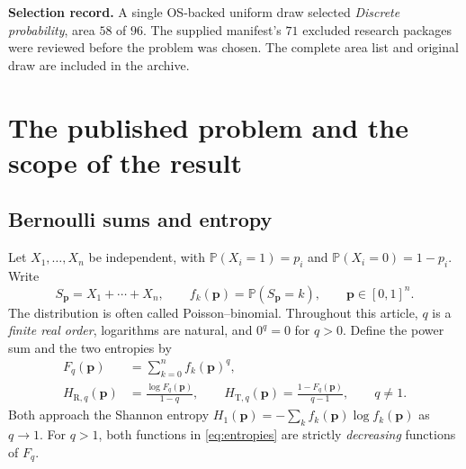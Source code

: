 \documentclass[11pt]{article}
\numberwithin{equation}{section}
\theoremstyle{definition}
\theoremstyle{remark}
\newcommand{\HR}{H_{\mathrm R,q}}
\newcommand{\HT}{H_{\mathrm T,q}}
\begin{document}
\begin{titlepage}
\begin{abstract}
The all-order disproof is elementary and does not depend on numerical
experiments. Reproducible exact and symbolic checks accompany the article.
The general joint-concavity question for $0<q<1$ is not settled here, and
bibliographic priority and the proofs have not been independently refereed.

[Added 29 September 2026, batch~43: Part~II settles this question for the
joint bit vector (collision-free weighted sums) instead of the sum: R\'enyi
entropy is jointly concave in every dimension, Tsallis entropy for every
$0<q<1$ exactly up to nine bits. For the ordinary sum it stays open here.]
\end{abstract}
\vfill
\noindent\textbf{Selection record.} A single OS-backed uniform draw selected
\emph{Discrete probability}, area $58$ of $96$. The supplied manifest's
$71$ excluded research packages were reviewed before the problem was chosen.
The complete area list and original draw are included in the archive.
\end{titlepage}
\hypersetup{pageanchor=true}
\tableofcontents
\clearpage
{}

\section{The published problem and the scope of the result}\label{bep:sec:problem}
\subsection{Bernoulli sums and entropy}
Let $X_1,\ldots,X_n$ be independent, with
$\mathbb P(X_i=1)=p_i$ and $\mathbb P(X_i=0)=1-p_i$. Write
\begin{equation}
 S_{\boldsymbol p}=X_1+\cdots+X_n,\qquad
 f_k(\boldsymbol p)=\mathbb P(S_{\boldsymbol p}=k),\qquad
 \boldsymbol p\in[0,1]^n.
\end{equation}
The distribution is often called Poisson--binomial. Throughout this article,
$q$ is a \emph{finite real order}, logarithms are natural, and $0^q=0$ for
$q>0$. Define the power sum and the two entropies by
\begin{align}
 F_q(\boldsymbol p)&=\sum_{k=0}^n f_k(\boldsymbol p)^q,\label{eq:powersum}\\
 \HR(\boldsymbol p)&=\frac{\log F_q(\boldsymbol p)}{1-q},\qquad
 \HT(\boldsymbol p)=\frac{1-F_q(\boldsymbol p)}{q-1},\qquad q\ne1.
 \label{eq:entropies}
\end{align}
Both approach the Shannon entropy
$H_1(\boldsymbol p)=-\sum_k f_k(\boldsymbol p)\log f_k(\boldsymbol p)$ as
$q\to1$. For $q>1$, both functions in \eqref{eq:entropies} are strictly
\emph{decreasing} functions of $F_q$.
\end{document}
